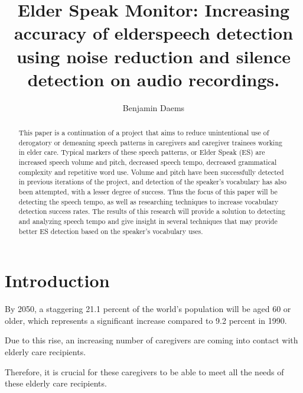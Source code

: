 \documentclass[english]{hogent-article}
\title{Elder Speak Monitor: Increasing accuracy of elderspeech detection using noise reduction and silence detection on audio recordings.}
\author{Benjamin Daems}
\begin{document}
\begin{abstract}
This paper is a continuation of a project that aims to reduce unintentional use of derogatory or demeaning speech patterns in caregivers and caregiver trainees working in elder care.
Typical markers of these speech patterns, or Elder Speak (ES) are increased speech volume and pitch, decreased speech tempo, decreased grammatical complexity and repetitive word use.
Volume and pitch have been successfully detected in previous iterations of the project, and detection of the speaker's vocabulary has also been attempted, with a lesser degree of success.
Thus the focus of this paper will be detecting the speech tempo, as well as researching techniques to increase vocabulary detection success rates.
The results of this research will provide a solution to detecting and analyzing speech tempo and give insight in several techniques that may provide better ES detection based on the speaker's vocabulary uses. 
\end{abstract}

\tableofcontents

\bigskip






\section{Introduction}%
\label{sec:Introduction}

By 2050, a staggering 21.1 percent of the world's population will be aged 60 or older, which represents a significant increase compared to 9.2 percent in 1990.

Due to this rise, an increasing number of caregivers are coming into contact with elderly care recipients.

Therefore, it is crucial for these caregivers to be able to meet all the needs of these elderly care recipients.
\end{document}
